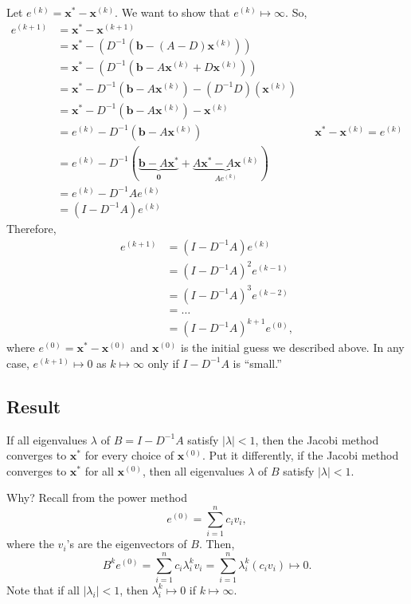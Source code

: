 \documentclass[letterpaper]{article}
\newcommand{\0}{\mathbf{0}}
\renewcommand{\b}{\mathbf{b}}
\newcommand{\x}{\mathbf{x}}
\begin{document}
\bigskip 

Let $e^{(k)} = \x^* - \x^{(k)}$. We want to show that $e^{(k)} \mapsto \infty$. So, 
\begin{equation*}
    \begin{aligned}
        e^{(k + 1)} &= \x^* - \x^{(k + 1)} \\ 
            &= \x^* - (D^{-1} (\b - (A - D)\x^{(k)})) \\ 
            &= \x^* - (D^{-1} (\b - A\x^{(k)} + D\x^{(k)})) \\ 
            &= \x^* - D^{-1} (\b - A\x^{(k)}) - (D^{-1}D)(\x^{(k)}) \\ 
            &= \x^* - D^{-1} (\b - A\x^{(k)}) - \x^{(k)} \\ 
            &= e^{(k)} - D^{-1} (\b - A\x^{(k)}) && \x^* - \x^{(k)} = e^{(k)} \\
            &= e^{(k)} - D^{-1} (\underbrace{\b - A\x^*}_{\0} + \underbrace{A\x^* - A\x^{(k)}}_{Ae^{(k)}}) \\ 
            &= e^{(k)} - D^{-1}Ae^{(k)} \\ 
            &= (I - D^{-1}A)e^{(k)} 
    \end{aligned}
\end{equation*}
Therefore, 
\begin{equation*}
    \begin{aligned}
        e^{(k + 1)} &= (I - D^{-1}A)e^{(k)}  \\ 
            &= (I - D^{-1} A)^2 e^{(k - 1)} \\ 
            &= (I - D^{-1} A)^3 e^{(k - 2)} \\ 
            &= \hdots \\ 
            &= (I - D^{-1} A)^{k + 1} e^{(0)},
    \end{aligned}
\end{equation*}
where $e^{(0)} = \x^* - \x^{(0)}$ and $\x^{(0)}$ is the initial guess we described above. In any case, $e^{(k + 1)} \mapsto 0$ as $k \mapsto \infty$ only if $I - D^{-1}A$ is ``small.''

\subsection{Result}
If all eigenvalues $\lambda$ of $B = I - D^{-1}A$ satisfy $|\lambda| < 1$, then the Jacobi method converges to $\x^*$ for every choice of $\x^{(0)}$. Put it differently, if the Jacobi method converges to $\x^*$ for all $\x^{(0)}$, then all eigenvalues $\lambda$ of $B$ satisfy $|\lambda| < 1$. 

\bigskip 

Why? Recall from the power method 
\[e^{(0)} = \sum_{i = 1}^{n} c_i v_i,\]
where the $v_i$'s are the eigenvectors of $B$. Then, 
\[B^k e^{(0)} = \sum_{i = 1}^{n} c_i \lambda_i^k v_i = \sum_{i = 1}^{n} \lambda_i^k (c_i v_i) \mapsto 0.\] Note that if all $|\lambda_i| < 1$, then $\lambda_i^k \mapsto 0$ if $k \mapsto \infty$.  
\end{document}
